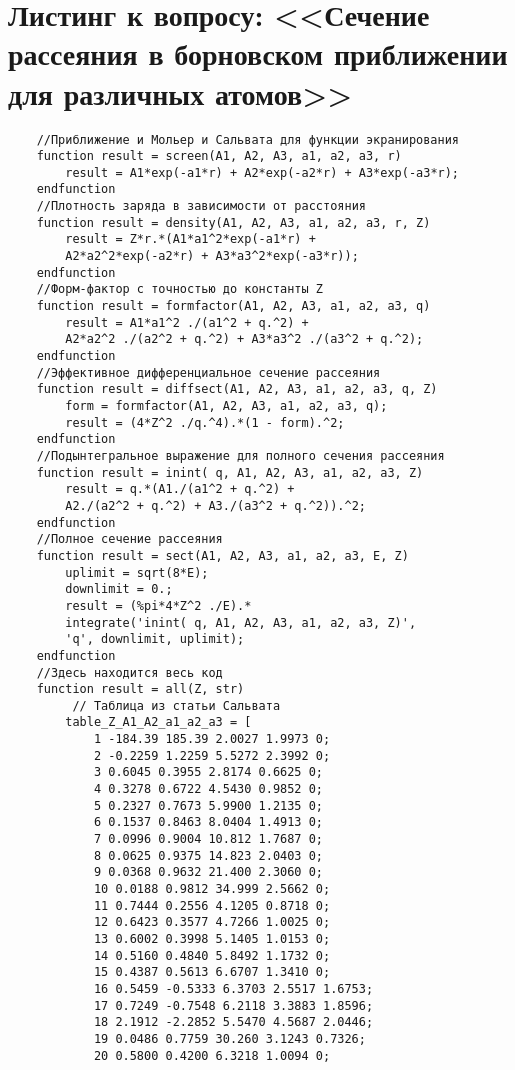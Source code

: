 \documentclass[a4paper,14pt]{extarticle} %
\begin{document}
\section{Листинг к вопросу: <<Сечение рассеяния в борновском приближении для различных атомов>>}
	\label{pril2}
\begin{verbatim}
	//Приближение и Мольер и Сальвата для функции экранирования
	function result = screen(A1, A2, A3, a1, a2, a3, r)
	    result = A1*exp(-a1*r) + A2*exp(-a2*r) + A3*exp(-a3*r);
	endfunction
	//Плотность заряда в зависимости от расстояния
	function result = density(A1, A2, A3, a1, a2, a3, r, Z)
	    result = Z*r.*(A1*a1^2*exp(-a1*r) + 
	    A2*a2^2*exp(-a2*r) + A3*a3^2*exp(-a3*r));
	endfunction
	//Форм-фактор с точностью до константы Z
	function result = formfactor(A1, A2, A3, a1, a2, a3, q)
	    result = A1*a1^2 ./(a1^2 + q.^2) + 
	    A2*a2^2 ./(a2^2 + q.^2) + A3*a3^2 ./(a3^2 + q.^2);
	endfunction
	//Эффективное дифференциальное сечение рассеяния
	function result = diffsect(A1, A2, A3, a1, a2, a3, q, Z)
	    form = formfactor(A1, A2, A3, a1, a2, a3, q);
	    result = (4*Z^2 ./q.^4).*(1 - form).^2;
	endfunction
	//Подынтегральное выражение для полного сечения рассеяния
	function result = inint( q, A1, A2, A3, a1, a2, a3, Z)
	    result = q.*(A1./(a1^2 + q.^2) + 
	    A2./(a2^2 + q.^2) + A3./(a3^2 + q.^2)).^2;
	endfunction
	//Полное сечение рассеяния
	function result = sect(A1, A2, A3, a1, a2, a3, E, Z)
	    uplimit = sqrt(8*E);
	    downlimit = 0.;
	    result = (%pi*4*Z^2 ./E).*
	    integrate('inint( q, A1, A2, A3, a1, a2, a3, Z)', 
	    'q', downlimit, uplimit);
	endfunction
	//Здесь находится весь код
	function result = all(Z, str)
		 // Таблица из статьи Сальвата
	    table_Z_A1_A2_a1_a2_a3 = [
	        1 -184.39 185.39 2.0027 1.9973 0;
	        2 -0.2259 1.2259 5.5272 2.3992 0;
	        3 0.6045 0.3955 2.8174 0.6625 0;
	        4 0.3278 0.6722 4.5430 0.9852 0;
	        5 0.2327 0.7673 5.9900 1.2135 0;
	        6 0.1537 0.8463 8.0404 1.4913 0;
	        7 0.0996 0.9004 10.812 1.7687 0;
	        8 0.0625 0.9375 14.823 2.0403 0;
	        9 0.0368 0.9632 21.400 2.3060 0;
	        10 0.0188 0.9812 34.999 2.5662 0;
	        11 0.7444 0.2556 4.1205 0.8718 0;
	        12 0.6423 0.3577 4.7266 1.0025 0;
	        13 0.6002 0.3998 5.1405 1.0153 0;
	        14 0.5160 0.4840 5.8492 1.1732 0;
	        15 0.4387 0.5613 6.6707 1.3410 0;
	        16 0.5459 -0.5333 6.3703 2.5517 1.6753;
	        17 0.7249 -0.7548 6.2118 3.3883 1.8596;
	        18 2.1912 -2.2852 5.5470 4.5687 2.0446;
	        19 0.0486 0.7759 30.260 3.1243 0.7326;
	        20 0.5800 0.4200 6.3218 1.0094 0;

\end{verbatim}
\end{document}

